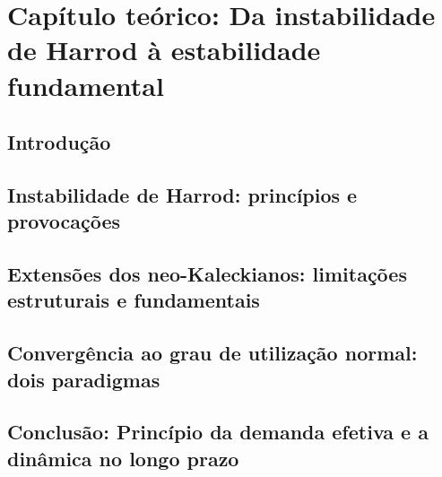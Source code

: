 \chapter{Capítulo teórico: Da instabilidade de Harrod à estabilidade fundamental}

\section{Introdução}

\section{Instabilidade de Harrod: princípios e provocações}

\section{Extensões dos neo-Kaleckianos: limitações estruturais e fundamentais}

\section{Convergência ao grau de utilização normal: dois paradigmas}

\section{Conclusão: Princípio da demanda efetiva e a dinâmica no longo prazo}